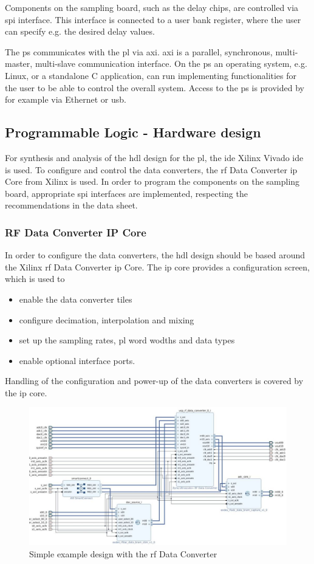 Components on the sampling board, such as the delay chips, are controlled via \gls{spi} interface. 
This interface is connected to a user bank register, where the user can specify e.g. the desired delay values.

The \gls{ps} communicates with the \gls{pl} via \gls{axi}.
\gls{axi} is a parallel, synchronous, multi-master, multi-slave communication interface.
On the \gls{ps} an operating system, e.g. Linux, or a standalone C application, can run implementing functionalities for the user to be able to control the overall system.
Access to the \gls{ps} is provided by for example via Ethernet or \gls{usb}.


\subsection{Programmable Logic - Hardware design}
For synthesis and analysis of the \gls{hdl} design for the \gls{pl}, the \gls{ide} Xilinx Vivado \gls{ide} is used.
To configure and control the data converters, the \gls{rf} Data Converter \gls{ip} Core from Xilinx is used.
In order to program the components on the sampling board, appropriate \gls{spi} interfaces are implemented, respecting the recommendations in the data sheet.

\subsubsection*{RF Data Converter IP Core}
In order to configure the data converters, the \gls{hdl} design should be based around the Xilinx \gls{rf} Data Converter \gls{ip} Core. 
The \gls{ip} core provides a configuration screen, which is used to 
\begin{itemize}
	\item enable the data converter tiles
	\item configure decimation, interpolation and mixing 
	\item set up the sampling rates, \gls{pl} word wodths and data types
	\item enable optional interface ports.
\end{itemize}
Handling of the configuration and power-up of the data converters is covered by the \gls{ip} core. 

\begin{figure}[tbh]
	\centering
	\includegraphics[width = \textwidth]{chap/05-readout/img/rf_data_converter}
	\caption{Simple example design with the \gls{rf} Data Converter}
	\label{fig:rf_dc_ex}
\end{figure}

